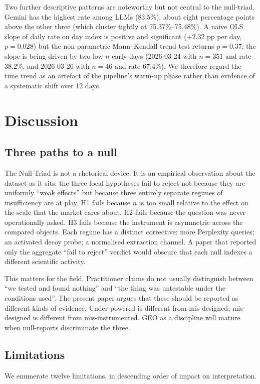 \documentclass[preprint,12pt,authoryear]{elsarticle}
\begin{document}
Two further descriptive patterns are noteworthy but not central to the null-triad. Gemini has the highest rate among LLMs (83.5\%), about eight percentage points above the other three (which cluster tightly at 75.37\%--75.48\%). A naive OLS slope of daily rate on day index is positive and significant ($+2.32$ pp per day, $p=0.028$) but the non-parametric Mann--Kendall trend test returns $p=0.37$; the slope is being driven by two low-$n$ early days (2026-03-24 with $n=351$ and rate 38.2\%, and 2026-03-26 with $n=46$ and rate 67.4\%). We therefore regard the time trend as an artefact of the pipeline's warm-up phase rather than evidence of a systematic shift over 12 days.

\section{Discussion}\label{sec:discussion}

\subsection{Three paths to a null}
The Null-Triad is not a rhetorical device. It is an empirical observation about the dataset as it sits: the three focal hypotheses fail to reject not because they are uniformly ``weak effects'' but because three entirely separate regimes of insufficiency are at play. H1 fails because $n$ is too small relative to the effect on the scale that the market cares about. H2 fails because the question was never operationally asked. H3 fails because the instrument is asymmetric across the compared objects. Each regime has a distinct corrective: more Perplexity queries; an activated decoy probe; a normalised extraction channel. A paper that reported only the aggregate ``fail to reject'' verdict would obscure that each null indexes a different scientific activity.

This matters for the field. Practitioner claims do not usually distinguish between ``we tested and found nothing'' and ``the thing was untestable under the conditions used''. The present paper argues that these should be reported as different kinds of evidence. Under-powered is different from mis-designed; mis-designed is different from mis-instrumented. GEO as a discipline will mature when null-reports discriminate the three.

\subsection{Limitations}
We enumerate twelve limitations, in descending order of impact on interpretation.
\end{document}
